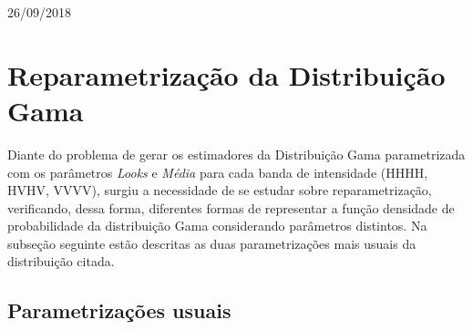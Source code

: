 \begin{titlepage}


{\large 26/09/2018}\\[2cm] %


 

\vfill %

\end{titlepage}


\section{Reparametrização da Distribuição Gama}

Diante do problema de gerar os estimadores da Distribuição Gama parametrizada com os parâmetros \textit{Looks} e \textit{Média} para cada banda de intensidade (HHHH, HVHV, VVVV), surgiu a necessidade de se estudar sobre reparametrização, verificando, dessa forma, diferentes formas de representar a função densidade de probabilidade da distribuição Gama considerando parâmetros distintos. Na subseção seguinte estão descritas as duas parametrizações mais usuais da distribuição citada.

\subsection{Parametrizações usuais}

